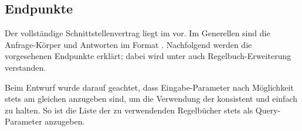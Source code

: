 \begin{listing}[!ht]
    \caption{Charakter Schema in api-contract.yaml}\label{lst:characterSchema}
\end{listing}

\subsection{Endpunkte}\label{subsec:endpunkte}

Der vollständige Schnittstellenvertrag liegt im  vor.
Im Generellen sind die Anfrage-Körper und Antworten im Format \textbf{}\@.
Nachfolgend werden die vorgesehenen Endpunkte erklärt; dabei wird unter  auch Regelbuch-Erweiterung verstanden.

Beim Entwurf wurde darauf geachtet, dass Eingabe-Parameter nach Möglichkeit stets am gleichen  anzugeben sind, um die Verwendung der  konsistent und einfach zu halten.
So ist \zB die Liste der zu verwendenden Regelbücher stets als \sog Query-Parameter anzugeben.

